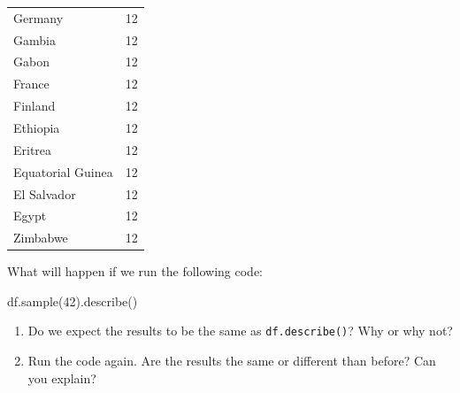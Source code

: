 \documentclass[
  letterpaper,
  DIV=11,
  numbers=noendperiod]{scrreprt}
\newenvironment{Shaded}{\begin{snugshade}}{\end{snugshade}}
\newcommand{\DecValTok}[1]{\textcolor[rgb]{0.68,0.00,0.00}{#1}}
\newcommand{\NormalTok}[1]{\textcolor[rgb]{0.00,0.23,0.31}{#1}}
\providecommand{\tightlist}{%
  \setlength{\itemsep}{0pt}\setlength{\parskip}{0pt}}\usepackage{longtable,booktabs,array}
\begin{document}
\begin{tabular}{lr}
Germany                  &       12 \\
Gambia                   &       12 \\
Gabon                    &       12 \\
France                   &       12 \\
Finland                  &       12 \\
Ethiopia                 &       12 \\
Eritrea                  &       12 \\
Equatorial Guinea        &       12 \\
El Salvador              &       12 \\
Egypt                    &       12 \\
Zimbabwe                 &       12 \\
\bottomrule
\end{tabular}

\begin{tcolorbox}[enhanced jigsaw, rightrule=.15mm, opacitybacktitle=0.6, colback=white, toprule=.15mm, colframe=quarto-callout-warning-color-frame, bottomtitle=1mm, bottomrule=.15mm, arc=.35mm, coltitle=black, breakable, title={Challenge 2}, titlerule=0mm, opacityback=0, colbacktitle=quarto-callout-warning-color!10!white, left=2mm, toptitle=1mm, leftrule=.75mm]

What will happen if we run the following code:

\begin{Shaded}
\begin{Highlighting}[]
\NormalTok{df.sample(}\DecValTok{42}\NormalTok{).describe()}
\end{Highlighting}
\end{Shaded}

\begin{enumerate}
\def\labelenumi{\arabic{enumi}.}
\tightlist
\item
  Do we expect the results to be the same as \texttt{df.describe()}? Why
  or why not?
\item
  Run the code again. Are the results the same or different than before?
  Can you explain?
\end{enumerate}

\end{tcolorbox}
\end{document}
